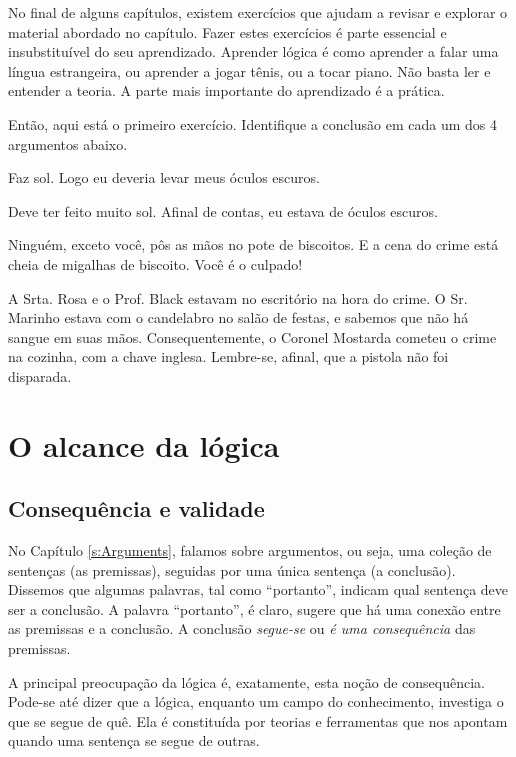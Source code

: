 \practiceproblems
No final de alguns capítulos, existem exercícios que ajudam a revisar e explorar 
o material abordado no capítulo.
Fazer estes exercícios é parte essencial e insubstituível do seu aprendizado.
Aprender lógica é como aprender a falar uma língua estrangeira, ou aprender a jogar tênis, ou a tocar piano.
Não basta ler e entender a teoria.
A parte mais importante do aprendizado é a prática.

\medskip


Então, aqui está o primeiro exercício. Identifique a conclusão em cada um dos 4 argumentos abaixo.
\begin{earg}
	\item Faz sol. Logo eu deveria levar meus óculos escuros.
	\item Deve ter feito muito sol. Afinal de contas, eu estava de óculos escuros.
	\item Ninguém, exceto você, pôs as mãos no pote de biscoitos.
	E a cena do crime está cheia de migalhas de biscoito.
	Você é o culpado!
	\item A Srta. Rosa e o Prof. Black estavam no escritório na hora do crime.
	O Sr. Marinho estava com o candelabro no salão de festas,
	e sabemos que não há sangue em suas mãos.
	Consequentemente, o Coronel Mostarda cometeu o crime na cozinha, com a chave inglesa.
	Lembre-se, afinal, que a pistola não foi disparada.
\end{earg}



\chapter{O alcance da lógica}
\label{s:Valid}

\section{Consequência e validade}

No Capítulo \ref{s:Arguments}, falamos sobre argumentos, ou seja, uma coleção de sentenças (as premissas), seguidas por uma única sentença (a conclusão).
Dissemos que algumas palavras, tal como ``portanto'', indicam qual sentença deve ser a conclusão.
A palavra ``portanto'', é claro, sugere que há uma conexão entre as premissas e a conclusão.
A conclusão \emph{segue-se} ou \emph{é uma consequência} das premissas.

A principal preocupação da lógica é, exatamente, esta noção de consequência.
Pode-se até dizer que a lógica, enquanto um campo do conhecimento, investiga o que se segue de quê.
Ela é constituída por teorias e ferramentas que nos apontam quando uma sentença se segue de outras.

